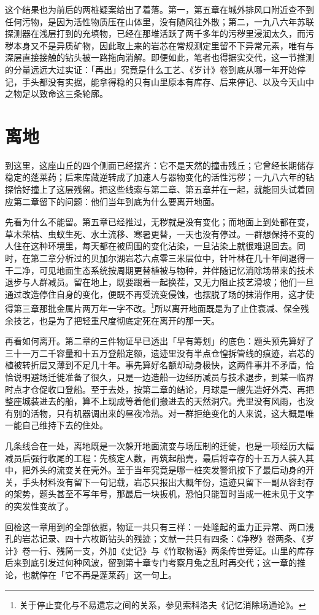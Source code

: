 这个结果也为前后的两桩疑案给出了着落。第一，第五章在城外排风口附近查不到任何污物，是因为活性物质压在山体里，没有随风往外散；第二，一九八六年苏联探测器在浅层打到的充填物，已经在那堆活跃了两千多年的污秽里浸润太久，而污秽本身又不是异质矿物，因此取上来的岩芯在常规测定里留不下异常元素，唯有与深层直接接触的钻头被一路拖向消解。即便如此，笔者也得据实交代，这一节推测的分量远远大过实证：「再出」究竟是什么工艺、《岁计》卷到底从哪一年开始停记，手头都没有实据，能拿得稳的只有山里原本有库存、后来停记、以及今天山中之物足以致命这三条轮廓。

\section{离地}

到这里，这座山丘的四个侧面已经摆齐：它不是天然的撞击残丘；它曾经长期储存稳定的蓬莱药；后来库藏逆转成了加速人与器物变化的活性污秽；一九八六年的钻探恰好撞上了这层残留。把这些线索与第二章、第五章并在一起，就能回头试着回应第二章留下的问题：他们当年到底为什么要离开地面。

先看为什么不能留。第五章已经推过，无秽就是没有变化；而地面上到处都在变，草木荣枯、虫蚁生死、水土流移、寒暑更替，一天也没有停过。一群想保持不变的人住在这种环境里，每天都在被周围的变化沾染，一旦沾染上就很难退回去。同时，在第二章分析过的贝加尔湖岩芯六点零三米层位中，针叶林在几十年间退得一干二净，可见地面生态系统按周期更替植被与物种，并伴随记忆消除场带来的技术退步与人群减员。留在地上，既要跟着一起换茬，又无力阻止技艺滑坡；他们一旦通过改造停住自身的变化，便既不再受流变侵蚀，也摆脱了场的抹消作用，这才使得第三章那批金属片两万年一字不改。\footnote{关于停止变化与不易遗忘之间的关系，参见索科洛夫《记忆消除场通论》。}所以离开地面既是为了止住衰减、保全残余技艺，也是为了把轻重尺度彻底定死在离开的那一天。

再看如何离开。第二章的三件物证早已透出「早有筹划」的底色：题头预先算好了三十一万二千容量和十五万登船定额，遗迹里没有半点仓惶拆管线的痕迹，岩芯的植被转折层又薄到不足几十年。事先算好名额却动身极快，这两件事并不矛盾，恰恰说明避场迁徙准备了很久，只是一边造船一边经历减员与技术退步，到某一临界时点才仓促收口登船。至于去处，按第二章的结论，月球是一艘先造好外壳、再把整座城装进去的船，算不上现成等着他们搬进去的天然洞穴。壳里没有风雨，也没有别的活物，只有机器调出来的昼夜冷热。对一群拒绝变化的人来说，这大概是唯一能自己维持下去的住处。

几条线合在一处，离地既是一次躲开地面流变与场压制的迁徙，也是一项经历大幅减员后强行收尾的工程：先核定人数，再筑起船壳，最后将幸存的十五万人装入其中，把外头的流变关在壳外。至于当年究竟是哪一桩突发警讯按下了最后动身的开关，手头材料没有留下一句记载，岩芯只报出大概年份，遗迹只留下一副从容封存的架势，题头甚至不写年号，那最后一块扳机，恐怕只能暂时当成一桩未见于文字的突发性变故了。

回检这一章用到的全部依据，物证一共只有三样：一处隆起的重力正异常、两口浅孔的岩芯记录、四十六枚断钻头的残迹；文献一共只有四条：《净秽》卷两条、《岁计》卷一行、残简一支，外加《史记》与《竹取物语》两条传世旁证。山里的库存后来到底引发过何种风波，留到第十章专门考察月兔之乱时再交代；这一章的推论，也就停在「它不再是蓬莱药」这一句上。
